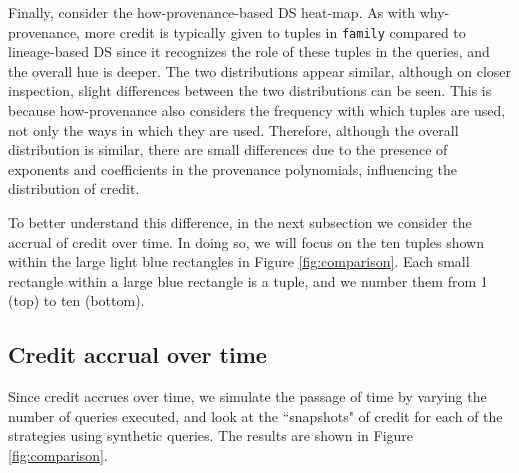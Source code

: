 Finally, consider the how-provenance-based DS heat-map. %
As with why-provenance, more credit is typically given to tuples in \texttt{family} compared to lineage-based DS since it recognizes the role of these tuples in the queries, and the overall hue is deeper.  
The two distributions appear similar, although on closer inspection, slight differences between the two distributions can be seen. 
This is because how-provenance also considers the frequency with which tuples are used, not only the ways in which they are used. Therefore, although the overall distribution is similar, there are small differences due to the presence of exponents and coefficients in the provenance polynomials, influencing the distribution of credit. 

To better understand this difference, in the next subsection we consider the accrual of credit over time.  In doing so, we will focus on the ten tuples shown within the large light blue rectangles in Figure \ref{fig:comparison}.  Each small rectangle within a large blue rectangle is a tuple, and we number them from 1 (top) to ten (bottom).  



\subsection{Credit accrual over time} 
Since credit accrues over time, we simulate the passage of time by varying the number of queries executed, and look at the ``snapshots" of credit for each of the strategies using synthetic queries.  The results are shown in Figure \ref{fig:comparison}.

